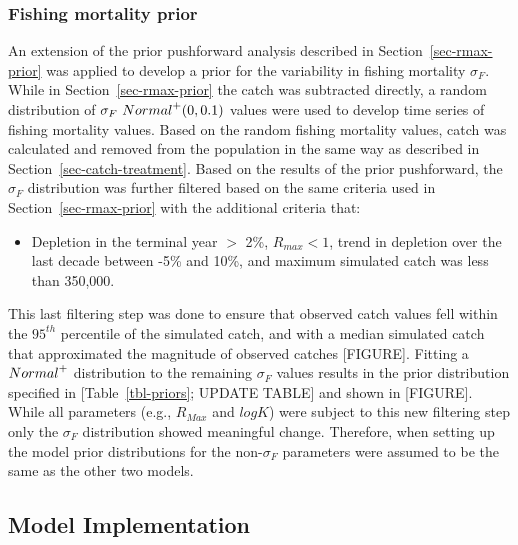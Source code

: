 \documentclass[
  11pt,
]{SCreport}
\providecommand{\tightlist}{%
  \setlength{\itemsep}{0pt}\setlength{\parskip}{0pt}}\usepackage{longtable,booktabs,array}
\begin{document}
\subsubsection{Fishing mortality prior}\label{sec-sigmaF-prior}

An extension of the prior pushforward analysis described in
Section~\ref{sec-rmax-prior} was applied to develop a prior for the
variability in fishing mortality \(\sigma_F\). While in
Section~\ref{sec-rmax-prior} the catch was subtracted directly, a random
distribution of \(\sigma_F ~ \mathnormal{Normal}^+(0,0.1)\) values were
used to develop time series of fishing mortality values. Based on the
random fishing mortality values, catch was calculated and removed from
the population in the same way as described in
Section~\ref{sec-catch-treatment}. Based on the results of the prior
pushforward, the \(\sigma_F\) distribution was further filtered based on
the same criteria used in Section~\ref{sec-rmax-prior} with the
additional criteria that:

\begin{itemize}
\tightlist
\item
  Depletion in the terminal year \(>\) 2\%, \(R_{max} < 1\), trend in
  depletion over the last decade between -5\% and 10\%, and maximum
  simulated catch was less than 350,000.
\end{itemize}

This last filtering step was done to ensure that observed catch values
fell within the \(95^{th}\) percentile of the simulated catch, and with
a median simulated catch that approximated the magnitude of observed
catches {[}FIGURE{]}. Fitting a \(\mathnormal{Normal}^+\) distribution
to the remaining \(\sigma_F\) values results in the prior distribution
specified in {[}Table~\ref{tbl-priors}; UPDATE TABLE{]} and shown in
{[}FIGURE{]}. While all parameters (e.g., \(R_{Max}\) and \(logK\)) were
subject to this new filtering step only the \(\sigma_F\) distribution
showed meaningful change. Therefore, when setting up the
 model prior distributions for the
non-\(\sigma_F\) parameters were assumed to be the same as the other two
models.

\subsection{Model Implementation}\label{sec-model-implementation}
\end{document}

